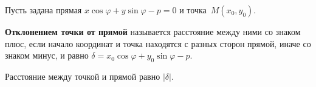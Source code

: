 Пусть задана прямая $x \cos \varphi + y \sin \varphi - p = 0$ и точка~$M(x_0, y_0)$.

 \textbf{Отклонением точки от прямой} называется расстояние между ними со знаком плюс, если начало координат и точка находятся с разных сторон прямой, иначе со знаком минус, и равно $\delta = x_0 \cos \varphi + y_0 \sin \varphi - p$.

Расстояние между точкой и прямой равно $|\delta|$.